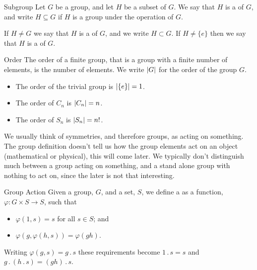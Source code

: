 \documentclass[fleqn]{NotesClass}
\newcommand{\cyclicGroupC}[1][n]{C_{#1}}
\newcommand{\symmetricGroup}[1][n]{S_{#1}}
\newcommand{\subgroup}{\subseteq}
\newcommand{\properSubgroup}{\subset}
\DeclarePairedDelimiter{\cardinality}{\lvert}{\rvert}
\newcommand{\action}{\mathbin{.}}
\begin{document}
    \begin{dfn}{Subgroup}{}
        Let \(G\) be a group, and let \(H\) be a subset of \(G\).
        We say that \(H\) is a  of \(G\), and write \(H \subgroup G\) if \(H\) is a group under the operation of \(G\).
        
        If \(H \ne G\) we say that \(H\) is a  of \(G\), and we write \(H \properSubgroup G\).
        If \(H \ne \{e\}\) then we say that \(H\) is a  of \(G\).
    \end{dfn}
    
    \begin{dfn}{Order}{}
        The order of a finite group, that is a group with a finite number of elements, is the number of elements.
        We write \(\cardinality{G}\) for the order of the group \(G\).
    \end{dfn}
    
    \begin{exm}{}{}
        \begin{itemize}
            \item The order of the trivial group is \(\cardinality{\{e\}} = 1\).
            \item The order of \(\cyclicGroupC\) is \(\cardinality{\cyclicGroupC} = n\).
            \item The order of \(\symmetricGroup\) is \(\cardinality{\symmetricGroup} = n!\).
        \end{itemize}
    \end{exm}
    
    We usually think of symmetries, and therefore groups, as acting on something.
    The group definition doesn't tell us how the group elements act on an object (mathematical or physical), this will come later.
    We typically don't distinguish much between a group acting on something, and a stand alone group with nothing to act on, since the later is not that interesting.
    
    \begin{dfn}{Group Action}{}
        Given a group, \(G\), and a set, \(S\), we define a  as a function, \(\varphi \colon G \times S \to S\), such that
        \begin{itemize}
            \item \(\varphi(1, s) = s\) for all \(s \in S\); and
            \item \(\varphi(g, \varphi(h, s)) = \varphi(gh)\).
        \end{itemize}
        Writing \(\varphi(g, s) = g \action s\) these requirements become \(1 \action s = s\) and \(g \action (h \action s) = (gh) \action s\).
    \end{dfn}
\end{document}
